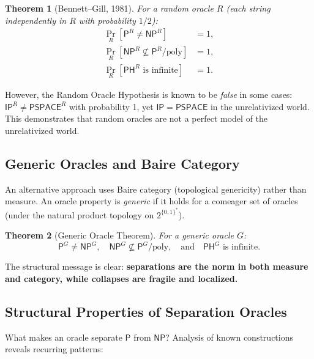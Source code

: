 \documentclass[11pt,a4paper]{article}
\theoremstyle{plain}
\newtheorem{theorem}{Theorem}[section]
\theoremstyle{definition}
\theoremstyle{remark}
\newcommand{\PP}{\mathsf{P}}
\newcommand{\NP}{\mathsf{NP}}
\newcommand{\PSPACE}{\mathsf{PSPACE}}
\newcommand{\PH}{\mathsf{PH}}
\newcommand{\IP}{\mathsf{IP}}
\newcommand{\poly}{\mathrm{poly}}
\newcommand{\bitsstar}{\{0,1\}^*}
\begin{document}
\begin{theorem}[Bennett--Gill, 1981]
For a random oracle $R$ (each string independently in $R$ with probability
$1/2$):
\begin{align*}
    \Pr_R[\PP^R \neq \NP^R] &= 1, \\
    \Pr_R[\NP^R \not\subseteq \PP^R/\poly] &= 1, \\
    \Pr_R[\PH^R \text{ is infinite}] &= 1.
\end{align*}
\end{theorem}

However, the Random Oracle Hypothesis is known to be \emph{false} in some cases:
$\IP^R \neq \PSPACE^R$ with probability 1, yet $\IP = \PSPACE$ in the
unrelativized world.  This demonstrates that random oracles are not a perfect
model of the unrelativized world.

\subsection{Generic Oracles and Baire Category}

An alternative approach uses Baire category (topological genericity) rather than
measure.  An oracle property is \emph{generic} if it holds for a comeager set of
oracles (under the natural product topology on $2^{\bitsstar}$).

\begin{theorem}[Generic Oracle Theorem]
For a generic oracle $G$:
\[
    \PP^G \neq \NP^G, \quad \NP^G \not\subseteq \PP^G/\poly, \quad
    \text{and} \quad \PH^G \text{ is infinite}.
\]
\end{theorem}

The structural message is clear: \textbf{separations are the norm in both measure
and category, while collapses are fragile and localized.}

\subsection{Structural Properties of Separation Oracles}

What makes an oracle separate $\PP$ from $\NP$?  Analysis of known constructions
reveals recurring patterns:
\end{document}
